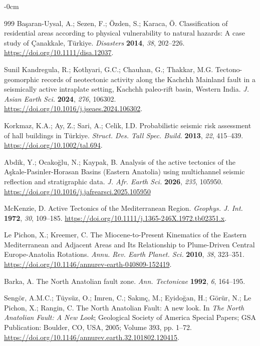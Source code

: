 \documentclass[data,article,accept,pdftex,moreauthors]{Definitions/mdpi}
\begin{document}
\begin{adjustwidth}{-\extralength}{0cm}
\begin{thebibliography}{999}
Başaran-Uysal, A.; Sezen, F.; Özden, S.; Karaca, Ö. Classification of residential areas according to physical vulnerability to natural hazards: A case study of Çanakkale, Türkiye. \emph{Disasters} \textbf{2014}, \emph{38}, 202--226. \url{https://doi.org/10.1111/disa.12037}.

Sunil Kandregula, R.; Kothyari, G.C.; Chauhan, G.; Thakkar, M.G. Tectono-geomorphic records of neotectonic activity along the Kachchh Mainland fault in a seismically active intraplate setting, Kachchh paleo-rift basin, Western India. \emph{J. Asian Earth Sci.} \textbf{2024}, \emph{276}, 106302. \url{https://doi.org/10.1016/j.jseaes.2024.106302}.

Korkmaz, K.A.; Ay, Z.; Sari, A.; Celik, I.D. Probabilistic seismic risk assessment of hall buildings in Türkiye. \emph{Struct. Des. Tall Spec. Build.} \textbf{2013}, \emph{22}, 415--439. \url{https://doi.org/10.1002/tal.694}.

Abdik, Y.; Ocako{\u g}lu, N.; Kaypak, B. Analysis of the active tectonics of the A{\c s}kale-Pasinler-Horasan Basins (Eastern Anatolia) using multichannel seismic reflection and stratigraphic data. \emph{J. Afr. Earth Sci.} \textbf{2026}, \emph{235}, 105950. \url{https://doi.org/10.1016/j.jafrearsci.2025.105950}

McKenzie, D. Active Tectonics of the Mediterranean Region. \emph{Geophys. J. Int.} \textbf{1972}, \emph{30}, 109--185. \url{https://doi.org/10.1111/j.1365-246X.1972.tb02351.x}. %

Le Pichon, X.; Kreemer, C. The Miocene-to-Present Kinematics of the Eastern Mediterranean and Adjacent Areas and Its Relationship to Plume-Driven Central Europe-Anatolia Rotations. \emph{Annu. Rev. Earth Planet. Sci.} \textbf{2010}, \emph{38}, 323--351. \url{https://doi.org/10.1146/annurev-earth-040809-152419}.

Barka, A. The North Anatolian fault zone. \emph{Ann. Tectonicae} \textbf{1992}, \emph{6}, 164--195.

Sengör, A.M.C.; Tüysüz, O.; Imren, C.; Sakınç, M.; Eyidoğan, H.; Görür, N.; Le Pichon, X.; Rangin, C. The North Anatolian Fault: A new look. In \emph{The North Anatolian Fault: A New Look}; Geological Society of America Special Papers; GSA Publication: Boulder, CO, USA, %
 2005; Volume 393, pp. 1--72. \url{https://doi.org/10.1146/annurev.earth.32.101802.120415}. %


\end{thebibliography}
\end{adjustwidth}
\end{document}

